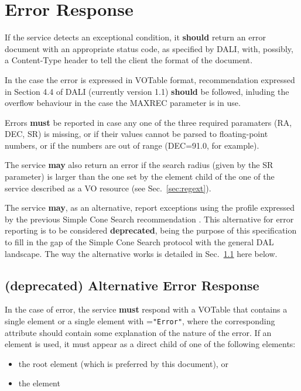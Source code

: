 \documentclass[11pt,a4paper]{ivoa} 
\begin{document}
\section{Error Response} \label{sec:error}

If the service detects an exceptional condition, it \textbf{should}
return an error document with an appropriate status code, as specified
by DALI, with, possibly, a Content-Type header to tell the client the
format of the document.

In the case the error is expressed in VOTable format, recommendation
expressed in Section 4.4 of DALI (currently version 1.1) \textbf{should}
be followed, inluding the overflow behaviour in the case the MAXREC
parameter is in use.

Errors \textbf{must} be reported in case any one of the three required
paramaters (RA, DEC, SR) is missing, or if their values cannot be parsed
to floating-point numbers, or if the numbers are out of range (DEC=91.0,
for example). 

The service \textbf{may} also return an error if the search radius
(given by the SR parameter) is larger than the one set by the
 element child of the  one of the service
described as a VO resource (see Sec.~\ref{sec:regext}).

The service \textbf{may}, as an alternative, report exceptions using the
profile expressed by the previous Simple Cone Search recommendation
\citep[v1.03]{std:SCS}. This alternative for error reporting is to be
considered \textbf{deprecated}, being the purpose of this specification
to fill in the gap of the Simple Cone Search protocol with the general
DAL landscape. The way the alternative works is detailed in
Sec.~\ref{subsec:err103} here below.

\subsection{(\textbf{deprecated}) Alternative Error Response}
\label{subsec:err103} In the case of error, the service \textbf{must}
respond with a VOTable that contains a single  element or a
single  element with =\texttt{"Error"}, where
the corresponding  attribute should contain some
explanation of the nature of the error. If an  element is
used, it must appear as a direct child of one of the following elements:
\begin{itemize} \item the root  element (which is
preferred by this document), or \item the  element
\end{itemize}
\end{document}

